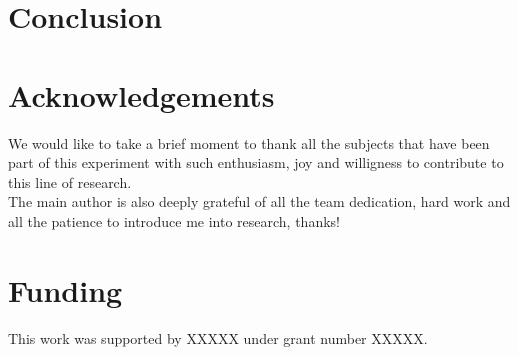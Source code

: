 \documentclass[english]{article}
\begin{document}
\section{Conclusion}
\label{sec:conclusion}


\newpage

\section*{Acknowledgements}

We would like to take a brief moment to thank all the subjects that have been part of this experiment with such enthusiasm, joy and willigness to contribute to this line of research.
\\

The main author is also deeply grateful of all the team dedication, hard work and all the patience to introduce me into research, thanks!

\section*{Funding}

This work was supported by XXXXX under grant number XXXXX.
\end{document}
